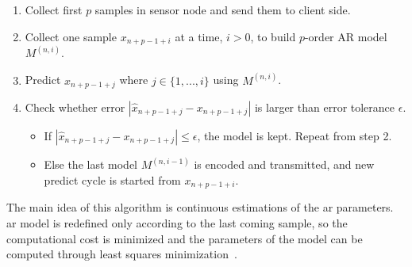 \begin{enumerate}
    \item Collect first $p$ samples in sensor node and send them to client side.
    \item Collect one sample $x_{n+p-1+i}$ at a time, $i > 0$, to build
    $p$-order
    AR model $M^{(n, i)}$.
    \item Predict $x_{n+p-1+j}$ where $j \in \{1, ..., i\}$ using $M^{(n, i)}$.
    \item Check whether error $ |\hat{x}_{n+p-1+j} - x_{n+p-1+j}|$ is larger
    than error tolerance $\epsilon$.
        \begin{itemize}
            \item If $|\hat{x}_{n+p-1+j} - x_{n+p-1+j}| \leqslant \epsilon$, the
            model is kept. Repeat from step 2.
            \item Else the last model $M^{(n, i-1)}$ is encoded and transmitted,
            and new predict cycle is started from $x_{n+p-1+i}$.
        \end{itemize}
\end{enumerate}
The main idea of this algorithm is continuous estimations of the \acrshort{ar}
parameters. \acrshort{ar} model is redefined only according to the last coming
sample, so the computational cost is minimized and the parameters of the model
can be computed through least squares minimization~\cite{zordan2012compress}.


